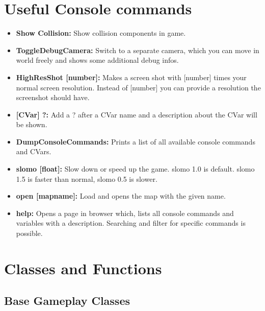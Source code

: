 \documentclass[10pt,a4paper]{article}
\begin{document}
\begin{multicols*}{2}
	\section{Useful Console commands}
	\begin{itemize}
		\item \textbf{Show Collision:} Show collision components in game.
		\item \textbf{ToggleDebugCamera:} Switch to a separate camera, which you can move in world freely and shows some additional debug infos.
		\item \textbf{HighResShot [number]:} Makes a screen shot with [number] times your normal screen resolution. Instead of [number] you can provide a resolution the screenshot should have.
		\item \textbf{[CVar] ?:} Add a ? after a CVar name and a description about the CVar will be shown.
		\item \textbf{DumpConsoleCommands:} Prints a list of all available console commands and CVars.
		\item \textbf{slomo [float]:} Slow down or speed up the game. slomo 1.0 is default. slomo 1.5 is faster than normal, slomo 0.5 is slower.
		\item \textbf {open [mapname]:} Load and opens the map with the given name.
		\item \textbf{help:} Opens a page in browser which, lists all console commands and variables with a description. Searching and filter for specific commands is possible.
	\end{itemize}
	
	
	
	\section{Classes and Functions}

	\subsection{Base Gameplay Classes}
	

\end{multicols*}
\end{document}
